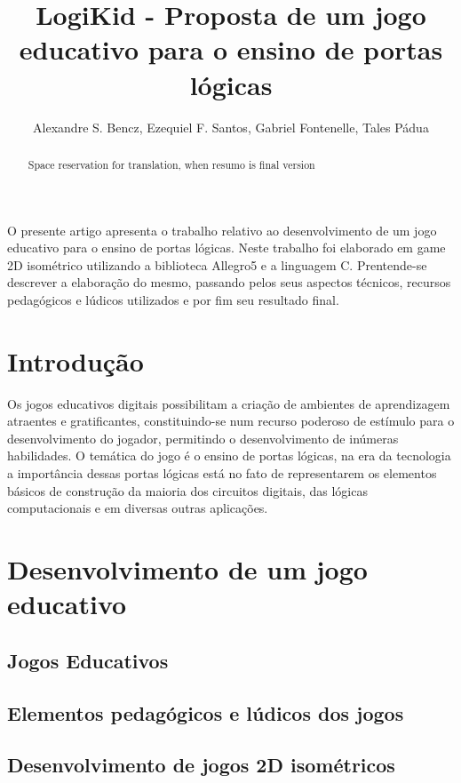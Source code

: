 \documentclass[12pt]{article}
\title{LogiKid - Proposta de um jogo educativo para o ensino de portas lógicas}
\author{Alexandre S. Bencz\inst{1}, Ezequiel F. Santos\inst{1}, Gabriel Fontenelle\inst{1}, Tales Pádua\inst{1} }
\begin{document}
 

\maketitle

\begin{abstract}
Space reservation for translation, when resumo is final version %
\end{abstract}
     
\begin{resumo} 
O presente artigo apresenta  o trabalho relativo ao desenvolvimento de um jogo educativo para o ensino de portas lógicas. Neste trabalho foi elaborado em game 2D isométrico utilizando a biblioteca Allegro5 e a linguagem C. Prentende-se descrever a elaboração do mesmo, passando pelos seus aspectos técnicos, recursos pedagógicos e lúdicos utilizados e por fim seu resultado final.
\end{resumo}


\section{Introdução}
Os jogos educativos digitais possibilitam a criação de ambientes de
aprendizagem atraentes e gratificantes, constituindo-se num recurso poderoso de
estímulo para o desenvolvimento do jogador, permitindo o desenvolvimento de
inúmeras habilidades. O temática do jogo é o ensino de portas lógicas, na era da tecnologia a importância dessas portas lógicas está no fato de representarem os elementos básicos de construção da maioria dos circuitos digitais, das lógicas computacionais e em diversas outras aplicações.


\section{Desenvolvimento de um jogo educativo} \label{sec:gamedev}


\subsection{Jogos Educativos}
\subsection{Elementos pedagógicos e lúdicos dos jogos}
\subsection{Desenvolvimento de jogos 2D isométricos}
\end{document}
